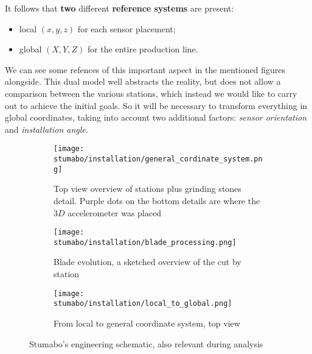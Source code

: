 It follows that \textbf{two} different \textbf{reference systems} are present:
\begin{itemize}\label{item:double_system}
    \item local $(x,y,z)$ for each sensor placement;
    \item global $(X,Y,Z)$ for the entire production line.
\end{itemize}
We can see some refences of this important aspect in the mentioned figures alongside. %
This dual model well abstracts the reality, but does not allow a comparison between the various stations, which instead we would like to carry out to achieve the initial goals.
So it will be necessary to transform everything in global coordinates, taking into account two additional factors:
 \textit{sensor orientation} and 
 \textit{installation angle}. 
\begin{figure}[!htp]
    \begin{subfigure}{\textwidth}
        \texttt{[image: stumabo/installation/general\_cordinate\_system.png]}
        \caption{Top view overview of stations plus grinding stones detail.
            Purple dots on the bottom details are where the $3D$ accelerometer was placed}
        \label{fig:top_view_line}
    \end{subfigure}
    \begin{subfigure}{\textwidth}
        \texttt{[image: stumabo/installation/blade\_processing.png]}
        \caption{Blade evolution, a sketched overview of the cut by station}
        \label{fig:blade_evolution}
    \end{subfigure}
    \begin{subfigure}{\textwidth}
        \texttt{[image: stumabo/installation/local\_to\_global.png]}
        \caption{From local to general coordinate system, top view}
        \label{fig:local_to_global}
    \end{subfigure}
    \caption{Stumabo's engineering schematic, also relevant during analysis}
    \label{fig:engineering_files}
\end{figure}

